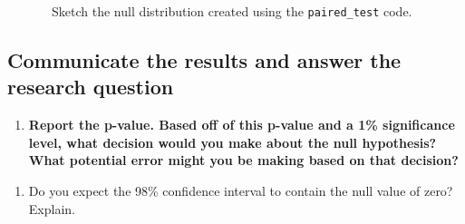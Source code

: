 \documentclass[
]{report}
\newenvironment{Shaded}{\begin{snugshade}}{\end{snugshade}}
\newcommand{\AttributeTok}[1]{\textcolor[rgb]{0.13,0.29,0.53}{#1}}
\newcommand{\CommentTok}[1]{\textcolor[rgb]{0.56,0.35,0.01}{\textit{#1}}}
\newcommand{\DecValTok}[1]{\textcolor[rgb]{0.00,0.00,0.81}{#1}}
\newcommand{\FunctionTok}[1]{\textcolor[rgb]{0.13,0.29,0.53}{\textbf{#1}}}
\newcommand{\NormalTok}[1]{#1}
\newcommand{\SpecialCharTok}[1]{\textcolor[rgb]{0.81,0.36,0.00}{\textbf{#1}}}
\newcommand{\StringTok}[1]{\textcolor[rgb]{0.31,0.60,0.02}{#1}}
\providecommand{\tightlist}{%
  \setlength{\itemsep}{0pt}\setlength{\parskip}{0pt}}
\begin{document}
\begin{Shaded}
\end{Shaded}

~~~~~~~Sketch the null distribution created using the \texttt{paired\_test} code.

\vspace{1.5in}

\subsection*{Communicate the results and answer the research question}\label{communicate-the-results-and-answer-the-research-question-3}

\begin{enumerate}
\def\labelenumi{\arabic{enumi}.}
\setcounter{enumi}{10}
\tightlist
\item
  \textbf{Report the p-value. Based off of this p-value and a 1\% significance level, what decision would you make about the null hypothesis? What potential error might you be making based on that decision?}
\end{enumerate}

\vspace{0.5in}

\begin{enumerate}
\def\labelenumi{\arabic{enumi}.}
\setcounter{enumi}{11}
\tightlist
\item
  Do you expect the 98\% confidence interval to contain the null value of zero? Explain.
\end{enumerate}
\end{document}
